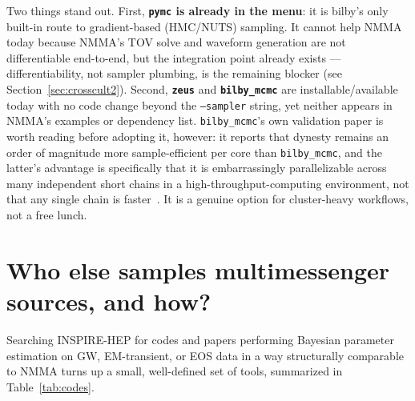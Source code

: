 \documentclass[11pt]{article}
\newcommand{\code}[1]{\texttt{#1}}
\begin{document}
Two things stand out. First, \textbf{\code{pymc} is already in the menu}: it is bilby's only
built-in route to gradient-based (HMC/NUTS) sampling. It cannot help NMMA today because
NMMA's TOV solve and waveform generation are not differentiable end-to-end, but the
integration point already exists --- differentiability, not sampler plumbing, is the
remaining blocker (see Section~\ref{sec:crosscult2}). Second, \textbf{\code{zeus}} and
\textbf{\code{bilby\_mcmc}} are installable/available today with no code change beyond the
\code{--sampler} string, yet neither appears in NMMA's examples or dependency list.
\code{bilby\_mcmc}'s own validation paper is worth reading before adopting it, however: it
reports that dynesty remains an order of magnitude more sample-efficient per core than
\code{bilby\_mcmc}, and the latter's advantage is specifically that it is embarrassingly
parallelizable across many independent short chains in a high-throughput-computing
environment, not that any single chain is faster~\cite{Ashton:2021anp}. It is a genuine
option for cluster-heavy workflows, not a free lunch.

\section{Who else samples multimessenger sources, and how?}

Searching INSPIRE-HEP for codes and papers performing Bayesian parameter estimation on GW,
EM-transient, or EOS data in a way structurally comparable to NMMA turns up a small,
well-defined set of tools, summarized in Table~\ref{tab:codes}.
\end{document}
